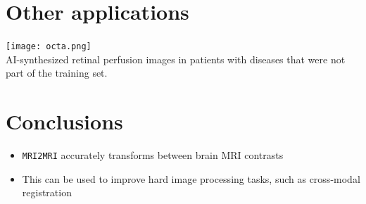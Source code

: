 \documentclass[a0, portrait]{a0poster}
\begin{document}
\begin{multicols}{2}
\section*{Other applications}

\begin{minipage}[t]{1\linewidth}
\texttt{[image: octa.png]}
\\
AI-synthesized retinal perfusion images in patients with diseases that were not part of the training set.
\end{minipage}

\color{SaddleBrown} %

\section*{Conclusions}

\begin{itemize}
\large
\item \texttt{MRI2MRI} accurately transforms between brain MRI contrasts

\item This can be used to improve hard image processing tasks, such as cross-modal registration

\end{itemize}

\color{DarkSlateGray} %


\nocite{*} %
\footnotesize  %


\end{multicols}
\end{document}
